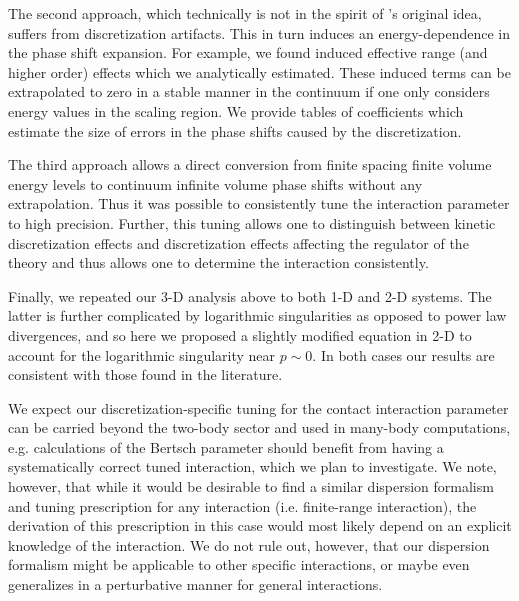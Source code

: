 The second approach, which technically is not in the spirit of \Luscher's original idea, suffers from discretization artifacts.  This in turn induces an energy-dependence in the phase shift expansion.
For example, we found induced effective range (and higher order) effects which we analytically estimated.
These induced terms can be extrapolated to zero in a stable manner in the continuum if one only considers energy values in the scaling region.
We provide tables of coefficients which estimate the size of errors in the phase shifts caused by the discretization.

The third approach allows a direct conversion from finite spacing finite volume energy levels to continuum infinite volume phase shifts without any extrapolation.
Thus it was possible to consistently tune the interaction parameter to high precision.  Further, this tuning allows one to distinguish between kinetic discretization effects and discretization effects affecting the regulator of the theory and thus allows one to determine the interaction consistently.

Finally, we repeated our 3-D analysis above to both 1-D and 2-D systems.  The latter is further complicated by logarithmic singularities as opposed to power law divergences, and so here we proposed a slightly modified \Luscher equation in 2-D to account for the logarithmic singularity near $p\sim 0$.  In both cases our results are consistent with those found in the literature.

We expect our discretization-specific tuning for the contact interaction parameter can be carried beyond the two-body sector and used in many-body computations, e.g. calculations of the Bertsch parameter should benefit from having a systematically correct tuned interaction, which we plan to investigate.  
We note, however, that while it would be desirable to find a similar dispersion formalism and tuning prescription for any interaction (i.e. finite-range interaction), the derivation of this prescription in this case would most likely depend on an explicit knowledge of the interaction.
We do not rule out, however, that our dispersion formalism might be applicable to other specific interactions, or maybe even generalizes in a perturbative manner for general interactions.  %


